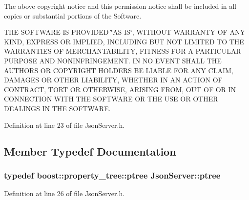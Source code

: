 The above copyright notice and this permission notice shall be included in all copies or substantial portions of the Software.

T\+H\+E S\+O\+F\+T\+W\+A\+R\+E I\+S P\+R\+O\+V\+I\+D\+E\+D \char`\"{}\+A\+S I\+S\char`\"{}, W\+I\+T\+H\+O\+U\+T W\+A\+R\+R\+A\+N\+T\+Y O\+F A\+N\+Y K\+I\+N\+D, E\+X\+P\+R\+E\+S\+S O\+R I\+M\+P\+L\+I\+E\+D, I\+N\+C\+L\+U\+D\+I\+N\+G B\+U\+T N\+O\+T L\+I\+M\+I\+T\+E\+D T\+O T\+H\+E W\+A\+R\+R\+A\+N\+T\+I\+E\+S O\+F M\+E\+R\+C\+H\+A\+N\+T\+A\+B\+I\+L\+I\+T\+Y, F\+I\+T\+N\+E\+S\+S F\+O\+R A P\+A\+R\+T\+I\+C\+U\+L\+A\+R P\+U\+R\+P\+O\+S\+E A\+N\+D N\+O\+N\+I\+N\+F\+R\+I\+N\+G\+E\+M\+E\+N\+T. I\+N N\+O E\+V\+E\+N\+T S\+H\+A\+L\+L T\+H\+E A\+U\+T\+H\+O\+R\+S O\+R C\+O\+P\+Y\+R\+I\+G\+H\+T H\+O\+L\+D\+E\+R\+S B\+E L\+I\+A\+B\+L\+E F\+O\+R A\+N\+Y C\+L\+A\+I\+M, D\+A\+M\+A\+G\+E\+S O\+R O\+T\+H\+E\+R L\+I\+A\+B\+I\+L\+I\+T\+Y, W\+H\+E\+T\+H\+E\+R I\+N A\+N A\+C\+T\+I\+O\+N O\+F C\+O\+N\+T\+R\+A\+C\+T, T\+O\+R\+T O\+R O\+T\+H\+E\+R\+W\+I\+S\+E, A\+R\+I\+S\+I\+N\+G F\+R\+O\+M, O\+U\+T O\+F O\+R I\+N C\+O\+N\+N\+E\+C\+T\+I\+O\+N W\+I\+T\+H T\+H\+E S\+O\+F\+T\+W\+A\+R\+E O\+R T\+H\+E U\+S\+E O\+R O\+T\+H\+E\+R D\+E\+A\+L\+I\+N\+G\+S I\+N T\+H\+E S\+O\+F\+T\+W\+A\+R\+E. 

Definition at line 23 of file Json\+Server.\+h.



\subsection{Member Typedef Documentation}
\hypertarget{class_json_server_ab33e8e19d7224157c203637791e09ea2}{
\subsubsection[{ptree}]{\setlength{\rightskip}{0pt plus 5cm}typedef boost\+::property\+\_\+tree\+::ptree {\bf Json\+Server\+::ptree}}}\label{class_json_server_ab33e8e19d7224157c203637791e09ea2}


Definition at line 26 of file Json\+Server.\+h.



